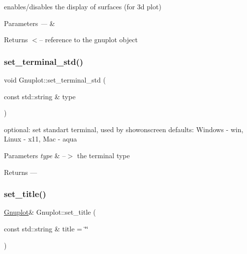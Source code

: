 enables/disables the display of surfaces (for 3d plot)


\begin{DoxyParams}{Parameters}
{\em ---} & \\
\hline
\end{DoxyParams}
\begin{DoxyReturn}{Returns}
$<$-- reference to the gnuplot object 
\end{DoxyReturn}
\mbox{\label{class_gnuplot_a21feba7a3916708b742c3dc25850ab2f}} 
\subsubsection{\texorpdfstring{set\+\_\+terminal\+\_\+std()}{set\_terminal\_std()}}
{\footnotesize\ttfamily void Gnuplot\+::set\+\_\+terminal\+\_\+std (\begin{DoxyParamCaption}\item[{const std\+::string \&}]{type }\end{DoxyParamCaption})\hspace{0.3cm}{\ttfamily [static]}}

optional\+: set standart terminal, used by showonscreen defaults\+: Windows -\/ win, Linux -\/ x11, Mac -\/ aqua


\begin{DoxyParams}{Parameters}
{\em type} & --$>$ the terminal type\\
\hline
\end{DoxyParams}
\begin{DoxyReturn}{Returns}
--- 
\end{DoxyReturn}
\mbox{\label{class_gnuplot_a4f93bac0e69dd83806652ca7226c6b3b}} 
\subsubsection{\texorpdfstring{set\+\_\+title()}{set\_title()}}
{\footnotesize\ttfamily \hyperlink{class_gnuplot}{Gnuplot}\& Gnuplot\+::set\+\_\+title (\begin{DoxyParamCaption}\item[{const std\+::string \&}]{title = {\ttfamily \char`\"{}\char`\"{}} }\end{DoxyParamCaption})\hspace{0.3cm}{\ttfamily [inline]}}



